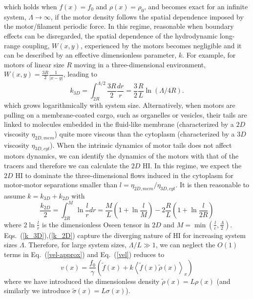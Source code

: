 \documentclass[prl,aps,twocolumn, floatfix, superscriptaddress,showpacs]{revtex4}
\begin{document}
which  holds when $f(x)=f_0$ and $\rho(x)=\rho_0$, and becomes exact for an infinite system, $\Lambda \rightarrow \infty$, if  the motor density follows the spatial dependence imposed by the  motor/filament periodic force. In this regime, reasonable when boundary effects can be disregarded, the  spatial dependence of the hydrodynamic long-range coupling, $W(x,y)$,  experienced by the motors becomes negligible and it 
can be described by an effective  dimensionless parameter, $k$. For example, for motors of linear size $R$ moving in a three-dimensional environment, $W(x,y)=\frac{3R}{2}\frac{1}{|x-y|}$, leading to
\begin{equation}
k_{3D}= \int_{2R}^{\Lambda/2} \frac{3R}{2}\frac{dr}{r}=\frac{3}{2}\frac{R}{L}\ln(\Lambda/4R).
\label{k_3D}
\end{equation}
which grows logarithmically with system size.
Alternatively, when motors are pulling on a membrane-coated cargo, such as organelles or vesicles, their tails are linked to molecules embedded in the fluid-like membrane (characterized by a $2D$ viscosity $\eta_{2D,mem}$) quite more viscous than the cytoplasm (characterized by a $3D$ viscosity $\eta_{3D,cyt}$). When the intrinsic dynamics of motor tails does not affect motors dynamics, we can identify the dynamics of the motors with that of the tracers and therefore we can calculate the $2D$ HI. In this regime, we expect the $2D$ HI to dominate  the three-dimensional flows induced in the cytoplasm for motor-motor separations smaller than $l=\eta_{2D,mem}/\eta_{3D,cyt}$. %
It is then reasonable to assume  $k=k_{3D}+k_{2D}$ with
\begin{equation}
\frac{k_{2D}}{2}= \int_{2R}^{M}\ln\frac{l}{r}dr=\frac{M}{L}\left(1+\ln\frac{l}{M}\right)-2\frac{R}{L}\left(1+\ln\frac{l}{2R}\right) 
\label{k_2D}
\end{equation}
where $2\ln\frac{l}{r}$ is the dimensionless Oseen tensor in $2D$ and $M=\min\left(\frac{l}{e},\frac{\Lambda}{2}\right)$. Eqs.~(\ref{k_3D}),(\ref{k_2D}) capture the diverging nature of HI for increasing system sizes $\Lambda$. Therefore, for large system sizes, $\Lambda/L\gg 1$, we can neglect the $O(1)$ terms in Eq.~(\ref{vel-approx}) and Eq.~(\ref{vel}) reduces to
\begin{equation}
v(x)=\frac{f_0}{\gamma}\left(\tilde{f}(x)+k\left\langle \tilde{f}(x)\tilde\rho(x)\right\rangle _{x}\right)
\end{equation}
where we have introduced the dimensionless density $\tilde\rho(x)=L \rho(x)$  (and similarly we introduce $\tilde\sigma(x)=L \sigma(x)$).
\end{document}
